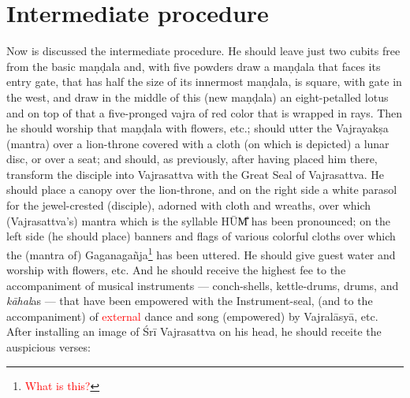 \documentclass[11pt]{book}
\makeatletter
\def\fakesc#1{%
  \begingroup%
  \xdef\fake@name{\csname\curr@fontshape/\f@size\endcsname}%
  \fontsize{1.3\fontdimen8\fake@name}{\baselineskip}\selectfont%
  \uppercase{#1}%
  \endgroup%
}
\newcommand{\mantra}[1]{\fakesc{#1}}
\newcommand{\red}[1]{\textcolor{red}{#1}}
\makeatother
\begin{document}
\section{Intermediate procedure}

Now is discussed the intermediate procedure. He should leave just two cubits free from the basic maṇḍala and, with five powders draw a maṇḍala that faces its entry gate, that has half the size of its innermost maṇḍala, is square, with gate in the west, and draw in the middle of this (new maṇḍala) an eight-petalled lotus and on top of that a five-pronged vajra of red color that is wrapped in rays.
	Then he should worship that maṇḍala with flowers, etc.; should utter the Vajrayakṣa (mantra) over a lion-throne covered with a cloth (on which is depicted) a lunar disc, or over a seat; and should, as previously, after having placed him there, transform the disciple into Vajrasattva with the Great Seal of Vajrasattva. He should place a canopy over the lion-throne, and on the right side a white parasol for the jewel-crested (disciple), adorned with cloth and wreaths, over which (Vajrasattva's) mantra which is the syllable \mantra{hūm̐} has been pronounced; on the left side (he should place) banners and flags of various colorful cloths over which the (mantra of) Gaganagañja\footnote{\red{What is this?}} has been uttered. He should give guest water and worship with flowers, etc. And he should receive the highest fee to the accompaniment of musical instruments —  conch-shells, kettle-drums, drums, and \emph{kāhal}as — that have been empowered with the Instrument-seal,  (and to the accompaniment) of \red{external} dance and song (empowered) by Vajralāsyā, etc. After installing an image of Śrī Vajrasattva on his head, he should receite the auspicious verses:
	
\end{document}
